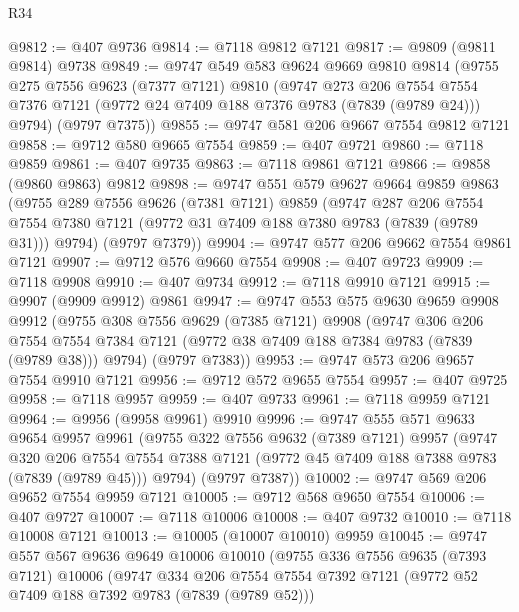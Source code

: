 \begin{lexlean}{R34}
\begin{coremodule}
@9812 := @407 @9736
@9814 := @7118 @9812 @7121
@9817 := @9809 (@9811 @9814) @9738
@9849 := @9747
    @549
    @583
    @9624
    @9669
    @9810
    @9814
    (@9755
      @275
      @7556
      @9623
      (@7377 @7121)
      @9810
      (@9747
        @273
        @206
        @7554
        @7554
        @7376
        @7121
        (@9772 @24 @7409 @188 @7376 @9783 (@7839 (@9789 @24)))
        @9794)
      (@9797 @7375))
@9855 := @9747 @581 @206 @9667 @7554 @9812 @7121
@9858 := @9712 @580 @9665 @7554
@9859 := @407 @9721
@9860 := @7118 @9859
@9861 := @407 @9735
@9863 := @7118 @9861 @7121
@9866 := @9858 (@9860 @9863) @9812
@9898 := @9747
    @551
    @579
    @9627
    @9664
    @9859
    @9863
    (@9755
      @289
      @7556
      @9626
      (@7381 @7121)
      @9859
      (@9747
        @287
        @206
        @7554
        @7554
        @7380
        @7121
        (@9772 @31 @7409 @188 @7380 @9783 (@7839 (@9789 @31)))
        @9794)
      (@9797 @7379))
@9904 := @9747 @577 @206 @9662 @7554 @9861 @7121
@9907 := @9712 @576 @9660 @7554
@9908 := @407 @9723
@9909 := @7118 @9908
@9910 := @407 @9734
@9912 := @7118 @9910 @7121
@9915 := @9907 (@9909 @9912) @9861
@9947 := @9747
    @553
    @575
    @9630
    @9659
    @9908
    @9912
    (@9755
      @308
      @7556
      @9629
      (@7385 @7121)
      @9908
      (@9747
        @306
        @206
        @7554
        @7554
        @7384
        @7121
        (@9772 @38 @7409 @188 @7384 @9783 (@7839 (@9789 @38)))
        @9794)
      (@9797 @7383))
@9953 := @9747 @573 @206 @9657 @7554 @9910 @7121
@9956 := @9712 @572 @9655 @7554
@9957 := @407 @9725
@9958 := @7118 @9957
@9959 := @407 @9733
@9961 := @7118 @9959 @7121
@9964 := @9956 (@9958 @9961) @9910
@9996 := @9747
    @555
    @571
    @9633
    @9654
    @9957
    @9961
    (@9755
      @322
      @7556
      @9632
      (@7389 @7121)
      @9957
      (@9747
        @320
        @206
        @7554
        @7554
        @7388
        @7121
        (@9772 @45 @7409 @188 @7388 @9783 (@7839 (@9789 @45)))
        @9794)
      (@9797 @7387))
@10002 := @9747 @569 @206 @9652 @7554 @9959 @7121
@10005 := @9712 @568 @9650 @7554
@10006 := @407 @9727
@10007 := @7118 @10006
@10008 := @407 @9732
@10010 := @7118 @10008 @7121
@10013 := @10005 (@10007 @10010) @9959
@10045 := @9747
    @557
    @567
    @9636
    @9649
    @10006
    @10010
    (@9755
      @336
      @7556
      @9635
      (@7393 @7121)
      @10006
      (@9747
        @334
        @206
        @7554
        @7554
        @7392
        @7121
        (@9772 @52 @7409 @188 @7392 @9783 (@7839 (@9789 @52)))

\end{coremodule}
\end{lexlean}
